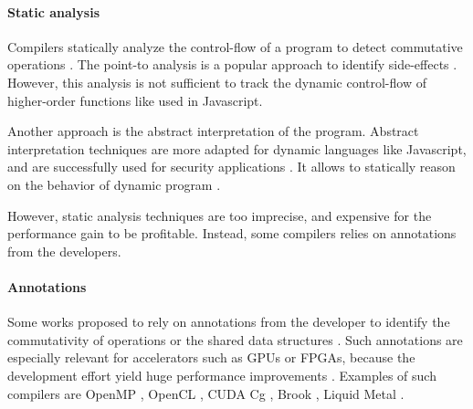 


\paragraph{Static analysis}

Compilers statically analyze the control-flow of a program to detect commutative operations \cite{Allen1970}.
The point-to analysis is a popular approach to identify side-effects \cite{Andersen1994,Jang2009,Sridharan2012,Wei2014}.
However, this analysis is not sufficient to track the dynamic control-flow of higher-order functions \cite{Shivers1991} like used in Javascript.

Another approach is the abstract interpretation of the program.
Abstract interpretation techniques are more adapted for dynamic languages like Javascript, and are successfully used for security applications \cite{Huang2004,Jovanovic2006,Yu2007,Maffeis2009a,Chudnov2015,Dolby2015}.
It allows to statically reason on the behavior of dynamic program \cite{Maffeis2008,Smith2011,Gardner2012,Hackett2012,Raychev2013,Gardner2013,Bodin2014}.

However, static analysis techniques are too imprecise, and expensive for the performance gain to be profitable.
Instead, some compilers relies on annotations from the developers.

\paragraph{Annotations}

Some works proposed to rely on annotations from the developer to identify the commutativity of operations or the shared data structures \cite{Vandierendonck2010a,Fernandez2014a}.
Such annotations are especially relevant for accelerators such as GPUs or FPGAs, because the development effort yield huge performance improvements \cite{Tarditi2006}.
Examples of such compilers are OpenMP \cite{Dagum1998}, OpenCL \cite{Stone2010}, CUDA \cite{Nvidia2007} Cg \cite{Mark2003}, Brook \cite{Buck2004}, Liquid Metal \cite{Huang2008}.

